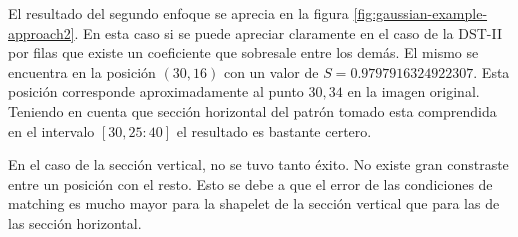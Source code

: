 El resultado del segundo enfoque se aprecia en la figura \ref{fig:gaussian-example-approach2}.
En esta caso si se puede apreciar claramente en el caso de la DST-II por filas que existe un coeficiente que sobresale
entre los demás. El mismo se encuentra en la posición $(30,16)$ con un valor de $S=0.9797916324922307$.
Esta posición corresponde aproximadamente al punto $30,34$ en la imagen original. Teniendo en cuenta que 
sección horizontal del patrón tomado esta comprendida en el intervalo $[30,25:40]$ el resultado es bastante certero.

En el caso de la sección vertical, no se tuvo tanto éxito. No existe gran constraste entre un posición con el resto. Esto
se debe a que el error de las condiciones de matching es mucho mayor para la shapelet de la sección vertical que para las
de las sección horizontal.


